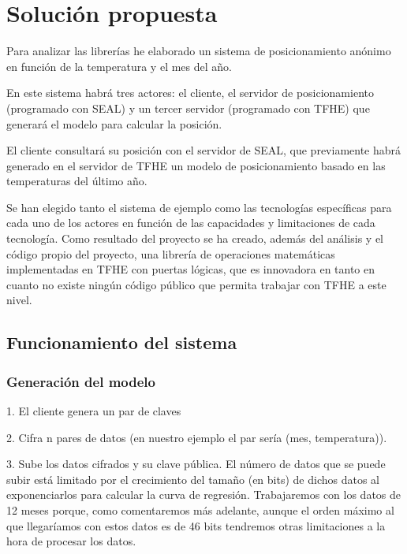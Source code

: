 \chapter{Solución propuesta}

Para analizar las librerías he elaborado un sistema de posicionamiento anónimo en función de la temperatura y el mes del año.

En este sistema habrá tres actores: el cliente, el servidor de posicionamiento (programado con SEAL) y un tercer servidor (programado con TFHE) que generará el modelo para calcular la posición.

El cliente consultará su posición con el servidor de SEAL, que previamente habrá generado en el servidor de TFHE un modelo de posicionamiento basado en las temperaturas del último año.

Se han elegido tanto el sistema de ejemplo como las tecnologías específicas para cada uno de los actores en función de las capacidades y limitaciones de cada tecnología. Como resultado del proyecto se ha creado, además del análisis y el código propio del proyecto, una librería de operaciones matemáticas implementadas en TFHE con puertas lógicas, que es innovadora en tanto en cuanto no existe ningún código público que permita trabajar con TFHE a este nivel.


\section{Funcionamiento del sistema}


\subsection{Generación del modelo}

1. El cliente genera un par de claves

2. Cifra n pares de datos (en nuestro ejemplo el par sería (mes, temperatura)).

3. Sube los datos cifrados y su clave pública. El número de datos que se puede subir está limitado por el crecimiento del tamaño (en bits) de dichos datos al exponenciarlos para calcular la curva de regresión. Trabajaremos con los datos de 12 meses porque, como comentaremos más adelante, aunque el orden máximo al que llegaríamos con estos datos es de 46 bits tendremos otras limitaciones a la hora de procesar los datos.

